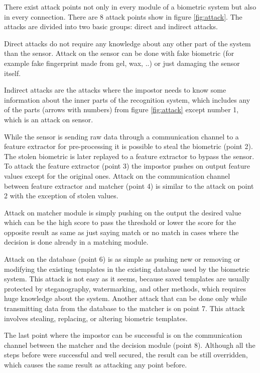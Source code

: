 There exist attack points not only in every module of a biometric system but also in every connection. There are 8 attack points show in figure \ref{fig:attack}. The attacks are divided into two basic groups: direct and indirect attacks.\cite{jain2015attacks}

Direct attacks do not require any knowledge about any other part of the system than the sensor. Attack on the sensor can be done with fake biometric (for example fake fingerprint made from gel, wax, ..) or just damaging the sensor itself.\cite{jain2015attacks}

Indirect attacks are the attacks where the impostor needs to know some information about the inner parts of the recognition system, which includes any of the parts (arrows with numbers) from figure \ref{fig:attack} except number 1, which is an attack on sensor.\cite{jain2015attacks}

While the sensor is sending raw data through a communication channel to a feature extractor for pre-processing it is possible to steal the biometric (point 2). The stolen biometric is later replayed to a feature extractor to bypass the sensor. To attack the feature extractor (point 3) the impostor pushes on output feature values except for the original ones. Attack on the communication channel between feature extractor and matcher (point 4) is similar to the attack on point 2 with the exception of stolen values.\cite{attack2}\cite{jain2015attacks}

Attack on matcher module is simply pushing on the output the desired value which can be the high score to pass the threshold or lower the score for the opposite result as same as just saying match or no match in cases where the decision is done already in a matching module.\cite{attack2} \cite{jain2015attacks}

Attack on the database (point 6) is as simple as pushing new or removing or modifying the existing templates in the existing database used by the biometric system. This attack is not easy as it seems, because saved templates are usually protected by steganography, watermarking, and other methods, which requires huge knowledge about the system. Another attack that can be done only while transmitting data from the database to the matcher is on point 7. This attack involves stealing, replacing, or altering biometric templates. \cite{mwema2015simple}\cite{jain2015attacks}

The last point where the impostor can be successful is on the communication channel between the matcher and the decision module (point 8). Although all the steps before were successful and well secured, the result can be still overridden, which causes the same result as attacking any point before.\cite{jain2015attacks}


